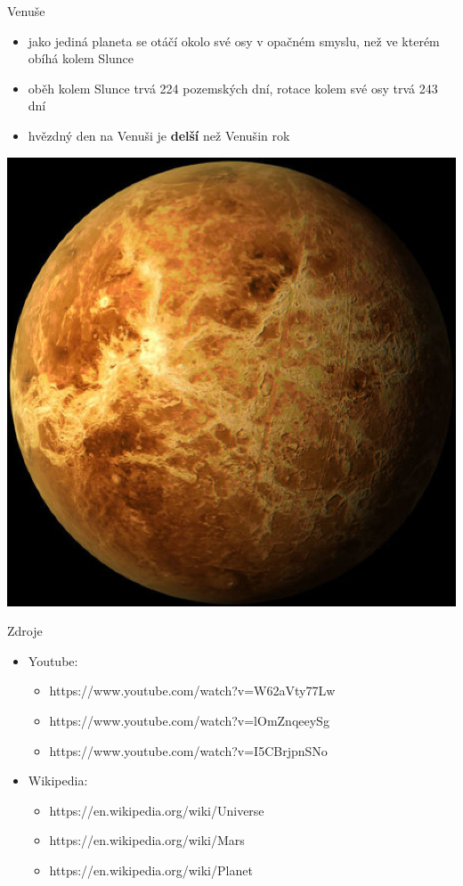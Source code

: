 \documentclass[pdf, slideColor]{beamer}
\begin{document}
\begin{frame}{Venuše}
\smallskip
\begin{itemize}
	\item jako jediná planeta se otáčí okolo své osy v opačném smyslu, než ve kterém obíhá kolem Slunce
	\item oběh kolem Slunce trvá 224 pozemských dní, rotace kolem své osy trvá 243 dní
	\item hvězdný den na Venuši je \textbf{delší} než Venušin rok 
\end{itemize}
\begin{center}
	\includegraphics[scale=0.25]{venuse}\\
\end{center}
\end{frame}

\begin{frame}{Zdroje}
\begin{itemize}
	\item Youtube: 
	\begin{itemize}
		\item https://www.youtube.com/watch?v=W62aVty77Lw
		\item https://www.youtube.com/watch?v=lOmZnqeeySg
		\item https://www.youtube.com/watch?v=I5CBrjpnSNo
	\end{itemize}
	
	\item Wikipedia: 
		\begin{itemize}
		\item https://en.wikipedia.org/wiki/Universe
		\item https://en.wikipedia.org/wiki/Mars
		\item https://en.wikipedia.org/wiki/Planet
	\end{itemize}
	
\end{itemize}
\end{frame}
\end{document}
